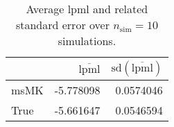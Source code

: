 \begin{table}[H]

\caption{Average lpml and related standard error over $n_{\text{sim}} = 10$ simulations.}
\centering
\begin{tabular}[t]{lrr}
\toprule
  & $\overbar{\text{lpml}}$ & $\text{sd}(\overbar{\text{lpml}})$\\
\midrule
msMK & -5.778098 & 0.0574046\\
True & -5.661647 & 0.0546594\\
\bottomrule
\end{tabular}
\end{table}